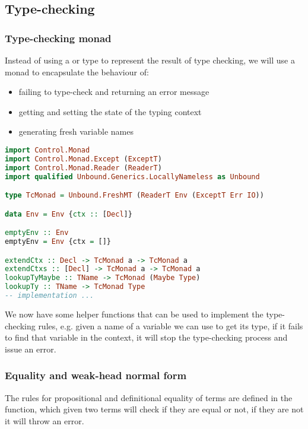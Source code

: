 \subsection{Type-checking}

\subsubsection{Type-checking monad}
Instead of using a  or  type to represent the result of type checking, we will use a monad to encapsulate the behaviour of:
\begin{itemize}
       \item failing to type-check and returning an error message
       \item getting and setting the state of the typing context
       \item generating fresh variable names
\end{itemize}

\begin{lstlisting}[language=Haskell]
import Control.Monad
import Control.Monad.Except (ExceptT)
import Control.Monad.Reader (ReaderT)
import qualified Unbound.Generics.LocallyNameless as Unbound

type TcMonad = Unbound.FreshMT (ReaderT Env (ExceptT Err IO))

data Env = Env {ctx :: [Decl]}

emptyEnv :: Env
emptyEnv = Env {ctx = []}

extendCtx :: Decl -> TcMonad a -> TcMonad a
extendCtxs :: [Decl] -> TcMonad a -> TcMonad a
lookupTyMaybe :: TName -> TcMonad (Maybe Type)
lookupTy :: TName -> TcMonad Type
-- implementation ...
\end{lstlisting}

We now have some helper functions that can be used to implement the type-checking rules, e.g. given a name of a variable we can use  to get its type, if it fails to find that variable in the context, it will stop the type-checking process and issue an error.

\subsubsection{Equality and weak-head normal form}

The rules for propositional and definitional equality of terms are defined in the  function, which given two terms will check if they are equal or not, if they are not it will throw an error.


